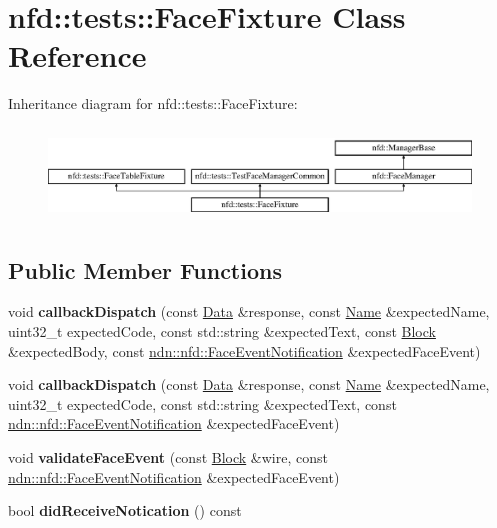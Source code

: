 \hypertarget{classnfd_1_1tests_1_1FaceFixture}{}\section{nfd\+:\+:tests\+:\+:Face\+Fixture Class Reference}
\label{classnfd_1_1tests_1_1FaceFixture}
Inheritance diagram for nfd\+:\+:tests\+:\+:Face\+Fixture\+:\begin{figure}[H]
\begin{center}
\leavevmode
\includegraphics[height=2.477876cm]{classnfd_1_1tests_1_1FaceFixture}
\end{center}
\end{figure}
\subsection*{Public Member Functions}
\begin{DoxyCompactItemize}
\item 
void {\bfseries callback\+Dispatch} (const \hyperlink{classndn_1_1Data}{Data} \&response, const \hyperlink{classndn_1_1Name}{Name} \&expected\+Name, uint32\+\_\+t expected\+Code, const std\+::string \&expected\+Text, const \hyperlink{classndn_1_1Block}{Block} \&expected\+Body, const \hyperlink{classndn_1_1nfd_1_1FaceEventNotification}{ndn\+::nfd\+::\+Face\+Event\+Notification} \&expected\+Face\+Event)\hypertarget{classnfd_1_1tests_1_1FaceFixture_a0db86a8a5b164ef4ab70369db1a8a9be}{}\label{classnfd_1_1tests_1_1FaceFixture_a0db86a8a5b164ef4ab70369db1a8a9be}

\item 
void {\bfseries callback\+Dispatch} (const \hyperlink{classndn_1_1Data}{Data} \&response, const \hyperlink{classndn_1_1Name}{Name} \&expected\+Name, uint32\+\_\+t expected\+Code, const std\+::string \&expected\+Text, const \hyperlink{classndn_1_1nfd_1_1FaceEventNotification}{ndn\+::nfd\+::\+Face\+Event\+Notification} \&expected\+Face\+Event)\hypertarget{classnfd_1_1tests_1_1FaceFixture_a1aa10955c8fffc4e6d5e003b17e31cd4}{}\label{classnfd_1_1tests_1_1FaceFixture_a1aa10955c8fffc4e6d5e003b17e31cd4}

\item 
void {\bfseries validate\+Face\+Event} (const \hyperlink{classndn_1_1Block}{Block} \&wire, const \hyperlink{classndn_1_1nfd_1_1FaceEventNotification}{ndn\+::nfd\+::\+Face\+Event\+Notification} \&expected\+Face\+Event)\hypertarget{classnfd_1_1tests_1_1FaceFixture_a266fc48a310c155cbe8abe9119e38278}{}\label{classnfd_1_1tests_1_1FaceFixture_a266fc48a310c155cbe8abe9119e38278}

\item 
bool {\bfseries did\+Receive\+Notication} () const\hypertarget{classnfd_1_1tests_1_1FaceFixture_a610cd25f2fda2754376bd2ac73441178}{}\label{classnfd_1_1tests_1_1FaceFixture_a610cd25f2fda2754376bd2ac73441178}

\end{DoxyCompactItemize}

